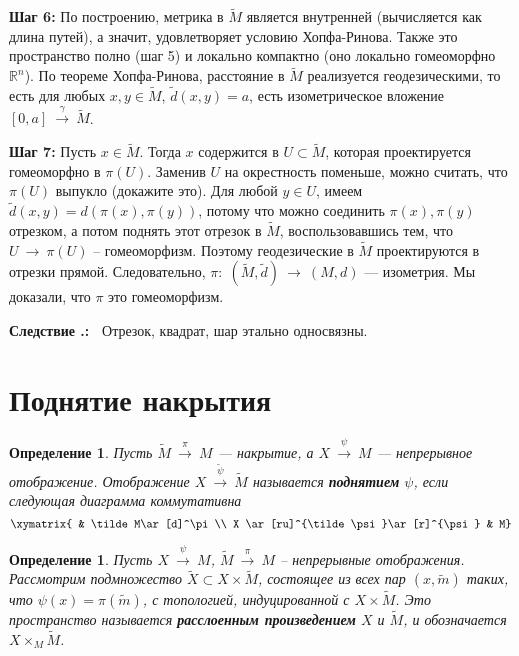 \documentclass[12pt]{book}
\newcommand{\arrow}{{\:\longrightarrow\:}}
\def\endproof{\hbox{\vrule width 5pt height 5pt depth 0pt}}
\def\R{{\mathbb R}}
\theoremstyle{upshape}
\theoremstyle{generic}
\newtheorem{opredelenie}[teorema]{Определение}
\def\еза{\end{remark}}
\theoremstyle{upshapenonumber}
\newcommand{\следствие}{%
     \refstepcounter{teorema}
     {\noindent\bf Следствие \thechapter.\arabic{teorema}:\ }}
\newcommand{\пример}{%
     \refstepcounter{teorema}
     {\noindent\bf Пример \thechapter.\arabic{teorema}:\ }}
\newcommand{\лемма}{%
     \refstepcounter{teorema}
     {\noindent\bf Лемма \thechapter.\arabic{teorema}:\ }}
\newcommand{\теорема}{%
     \refstepcounter{teorema}
     {\noindent\bf Теорема \thechapter.\arabic{teorema}:\ }}
\newcommand{\утверждение}{%
     \refstepcounter{teorema}
     {\noindent\bf Утверждение \thechapter.\arabic{teorema}:\ }}
\def\хфилл{\hfill}
\def\ноиндент{\noindent}
\def\бф{\bf}
\def\ем{\em}
\def\ез{\end{zadacha}}
\def\еу{\end{ukazanie}}
\def\определение{\begin{opredelenie}}
\def\ео{\end{opredelenie}}
\def\енум{\begin{enumerate}}
\def\ее{\end{enumerate}}
\begin{document}
\хфилл

\ноиндент
{\бф Шаг 6:}
По построению, метрика в $\tilde M$ является
внутренней (вычисляется как длина путей),
а значит, удовлетворяет условию Хопфа-Ринова.
Также это пространство полно (шаг 5)
и локально компактно (оно локально
гомеоморфно $\R^n$). По теореме Хопфа-Ринова, 
расстояние в $\tilde M$ реализуется геодезическими,
то есть для любых $x, y \in \tilde M$, $\tilde d(x,y)=a$, есть
изометрическое вложение $[0,a]\stackrel \gamma\arrow
\tilde M$.


\хфилл

\ноиндент
{\бф Шаг 7:} Пусть $x\in \tilde M$.
Тогда $x$ содержится в $U\subset \tilde M$,
которая проектируется гомеоморфно в $\pi(U)$.
Заменив $U$ на окрестность поменьше, можно считать,
что $\pi(U)$ выпукло (докажите это). 
Для любой $y\in U$, имеем
$\tilde d (x,y)= d(\pi(x), \pi(y))$, потому
что можно соединить $\pi(x), \pi(y)$ отрезком,
а потом поднять этот отрезок в $\tilde M$,
воспользовавшись тем, что $U\arrow \pi(U)$ 
-- гомеоморфизм. Поэтому геодезические
в $\tilde M$ проектируются в отрезки прямой.
Следовательно, $\pi:\; (\tilde M, \tilde d) 
\arrow(M, d)$ --- изометрия. Мы доказали,
что $\pi$ это гомеоморфизм.
\endproof

\хфилл

\следствие
Отрезок, квадрат, шар этально односвязны. 



\section{Поднятие накрытия}


\определение
Пусть $\tilde M \stackrel \pi\arrow M$ --- накрытие,
а $X\stackrel \psi \arrow M$ --- непрерывное отображение.
Отображение $X \stackrel{\tilde \psi}\arrow \tilde M$ называется
{\бф поднятием} $\psi$, если следующая диаграмма коммутативна
\[
\xymatrix{
& \tilde M\ar[d]^\pi \\ 
X \ar[ru]^{\tilde \psi}\ar[r]^{\psi} & M}
\]
\ео

\определение
Пусть $X\stackrel \psi \arrow M$,
$\tilde M \stackrel \pi\arrow M$ --
непрерывные отображения. Рассмотрим подмножество
$\tilde X \subset  X \times \tilde M$,
состоящее из всех пар $(x, \tilde m)$
таких, что $\psi(x) = \pi(\tilde m)$,
с топологией, индуцированной с $X \times \tilde M$.
Это пространство называется
{\бф расслоенным произведением}
$X$ и $\tilde M$, и обозначается
$X \times_M \tilde M$.
\ео
\end{document}
